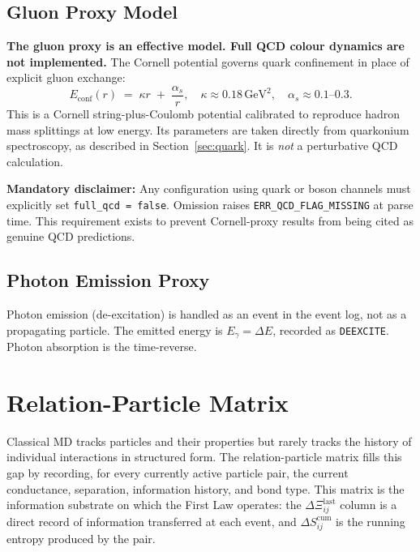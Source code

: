 \documentclass[11pt,a4paper]{article}
\newcommand{\Rec}{\Xi}
\begin{document}
\subsection{Gluon Proxy Model}

\textbf{The gluon proxy is an effective model.  Full QCD colour dynamics are
not implemented.}  The Cornell potential governs quark confinement in place of
explicit gluon exchange:
\[
  E_{\mathrm{conf}}(r) \;=\; \kappa r \;+\; \frac{\alpha_s}{r},
  \quad
  \kappa \approx 0.18\,\mathrm{GeV}^2,
  \quad
  \alpha_s \approx 0.1\text{--}0.3 .
\]
This is a Cornell string-plus-Coulomb potential calibrated to reproduce
hadron mass splittings at low energy.  Its parameters are taken directly
from quarkonium spectroscopy, as described in Section~\ref{sec:quark}.
It is \emph{not} a perturbative QCD calculation.

\begin{smlaw}
\textbf{Mandatory disclaimer:} Any configuration using quark or boson channels
must explicitly set \texttt{full\_qcd = false}.  Omission raises
\texttt{ERR\_QCD\_FLAG\_MISSING} at parse time.  This requirement exists to
prevent Cornell-proxy results from being cited as genuine QCD predictions.
\end{smlaw}

\subsection{Photon Emission Proxy}

Photon emission (de-excitation) is handled as an event in the event log,
not as a propagating particle.  The emitted energy is $E_\gamma = \Delta E$,
recorded as \texttt{DEEXCITE}.  Photon absorption is the time-reverse.

\section{Relation-Particle Matrix}\label{sec:relation}

Classical MD tracks particles and their properties but rarely tracks the
history of individual interactions in structured form.  The relation-particle
matrix fills this gap by recording, for every currently active particle pair,
the current conductance, separation, information history, and bond type.  This
matrix is the information substrate on which the First Law operates: the
$\Delta\Rec_{ij}^{\mathrm{last}}$ column is a direct record of information
transferred at each event, and $\Delta S_{ij}^{\mathrm{cum}}$ is the running
entropy produced by the pair.
\end{document}

